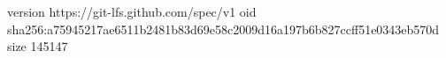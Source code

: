 version https://git-lfs.github.com/spec/v1
oid sha256:a75945217ae6511b2481b83d69e58c2009d16a197b6b827ccff51e0343eb570d
size 145147

